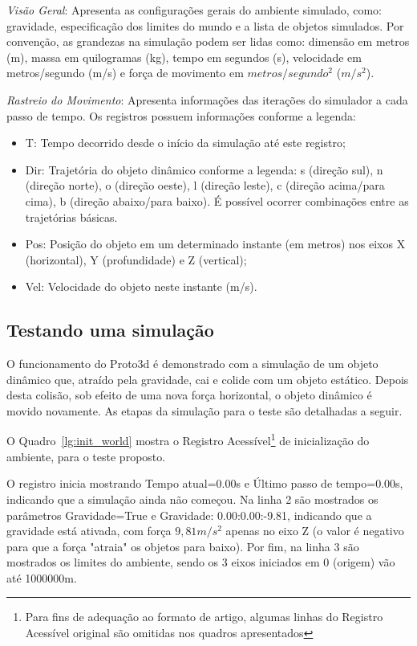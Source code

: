 \documentclass[12pt]{article}
\begin{document}
\emph{Visão Geral}: Apresenta as configurações gerais do ambiente simulado, como: gravidade, especificação dos limites do mundo e a lista de objetos simulados. Por convenção, as grandezas na simulação podem ser lidas como: dimensão em metros (m), massa em quilogramas (kg), tempo em segundos (s), velocidade em metros/segundo (m/s) e força de movimento em $metros/segundo^{2}$ ($m/s^{2}$).

\emph{Rastreio do Movimento}: Apresenta informações das iterações do simulador a cada passo de tempo. Os registros possuem informações conforme a legenda:

\begin{itemize}
	\item T: Tempo decorrido desde o início da simulação até este registro;
	\item Dir: Trajetória do objeto dinâmico conforme a legenda: s (direção sul), n (direção norte), o (direção oeste), l (direção leste), c (direção acima/para cima), b (direção abaixo/para baixo). É possível ocorrer combinações entre as trajetórias básicas. 
	\item Pos: Posição do objeto em um determinado instante (em metros) nos eixos X (horizontal), Y (profundidade) e Z (vertical);
	\item Vel: Velocidade do objeto neste instante (m/s).
\end{itemize}

\subsection{Testando uma simulação}
O funcionamento do Proto3d é demonstrado com a simulação de um objeto dinâmico que, atraído pela gravidade, cai e colide com um objeto estático. Depois desta colisão, sob efeito de uma nova força horizontal, o objeto dinâmico é movido novamente. As etapas da simulação para o teste são detalhadas a seguir. 

O Quadro~\ref{lg:init_world} mostra o Registro Acessível\footnote{Para fins de adequação ao formato de artigo, algumas linhas do Registro Acessível original são omitidas nos quadros apresentados} de inicialização do ambiente, para o teste proposto.

O registro inicia mostrando Tempo atual=0.00s e Último passo de tempo=0.00s, indicando que a simulação ainda não começou. Na linha 2 são mostrados os parâmetros Gravidade=True e Gravidade: 0.00:0.00:-9.81, indicando que a gravidade está ativada, com força $9,81 m/s^{2}$ apenas no eixo Z (o valor é negativo para que a força "atraia" os objetos para baixo). Por fim, na linha 3 são mostrados os limites do ambiente, sendo os 3 eixos iniciados em 0 (origem) vão até 1000000m.
\end{document}
